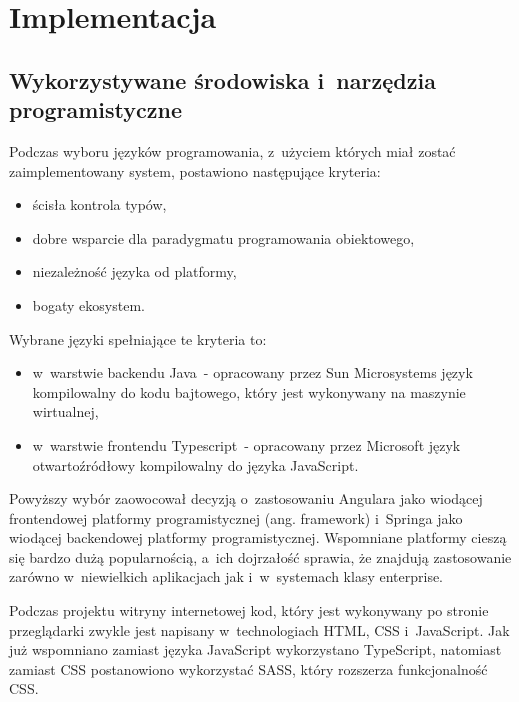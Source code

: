 \chapter{Implementacja}\label{ch:implementation}
\section{Wykorzystywane środowiska i~narzędzia programistyczne}\label{sec:dev-tools}

Podczas wyboru języków programowania, z~użyciem których miał zostać zaimplementowany system, postawiono następujące kryteria:

\begin{itemize}
    \item ścisła kontrola typów,
    \item dobre wsparcie dla paradygmatu programowania obiektowego,
    \item niezależność języka od platformy,
    \item bogaty ekosystem.
\end{itemize}

\par
Wybrane języki spełniające te kryteria to:

\begin{itemize}
    \item w~warstwie backendu Java\cite{tech:java}~- opracowany przez Sun Microsystems język kompilowalny do kodu bajtowego, który jest wykonywany na maszynie wirtualnej,
    \item w~warstwie frontendu Typescript\cite{tech:typescript}~- opracowany przez Microsoft język otwartoźródłowy kompilowalny do języka JavaScript\cite{tech:javascript}.
\end{itemize}

Powyższy wybór zaowocował decyzją o~zastosowaniu Angulara\cite{tech:angular} jako wiodącej frontendowej platformy programistycznej (ang. framework)
i~Springa\cite{tech:spring} jako wiodącej backendowej platformy programistycznej.
Wspomniane platformy cieszą się bardzo dużą popularnością, a~ich dojrzałość sprawia,
że znajdują zastosowanie zarówno w~niewielkich aplikacjach jak i~w~systemach klasy enterprise.

\par
Podczas projektu witryny internetowej kod, który jest wykonywany po stronie przeglądarki zwykle jest napisany w~technologiach HTML, CSS\cite{tech:html-css} i~JavaScript\cite{tech:javascript}.
Jak już wspomniano zamiast języka JavaScript wykorzystano TypeScript, natomiast zamiast CSS postanowiono wykorzystać SASS\cite{tech:sass}, który rozszerza funkcjonalność CSS.

